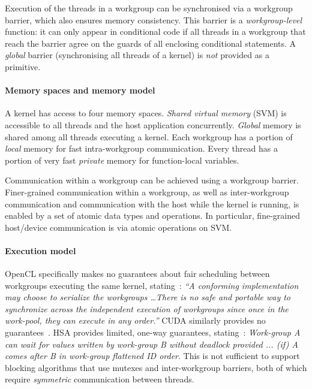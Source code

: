 \documentclass[numbers,nocopyrightspace,10pt]{sigplanconf}
\begin{document}
Execution of the threads in a workgroup can be synchronised via a
workgroup barrier, which also ensures memory consistency.  This
barrier is a \emph{workgroup-level} function: it can only
appear in conditional code if all threads in a workgroup that reach
the barrier agree on the guards of all enclosing conditional
statements.  A \emph{global} barrier
(synchronising all threads of a kernel) is \emph{not} provided as
a primitive.

\paragraph{Memory spaces and memory model}
A kernel has access to four memory spaces.  \emph{Shared virtual
memory} (SVM) is accessible to all threads and the host application concurrently.  \emph{Global} memory is shared among all threads executing a
kernel.  Each workgroup has a portion of \emph{local} memory for fast intra-workgroup communication.  Every thread has
a portion of very fast \emph{private} memory for 
function-local variables.

Communication within a workgroup can be achieved
using a workgroup barrier.  Finer-grained
communication within a workgroup, as well as inter-workgroup
communication and communication with the host while the kernel is
running, is enabled by a set of atomic data types and operations.  In
particular, fine-grained host/device communication is via atomic
operations on SVM.

\paragraph{Execution model}

OpenCL specifically makes no guarantees about fair scheduling between
workgroups executing the same kernel, stating~\cite[p.\ 31]{opencl2Spec}: \emph{``A
  conforming implementation may choose to serialize the workgroups 
\dots There is no safe and portable way to synchronize across
  the independent execution of workgroups since once in the work-pool,
  they can execute in any order.''}  CUDA similarly provides no guarantees~\cite{cuda-75}.
%
HSA provides limited, one-way guarantees,
stating~\cite[p. 46]{HSAprogramming11}: \emph{Work-group A can wait
  for values written by work-group B without deadlock provided ... (if) A
  comes after B in work-group flattened ID order}. This is not sufficient to support blocking algorithms that use
mutexes and inter-workgroup barriers, both of which require \emph{symmetric} communication between
threads.
\end{document}
